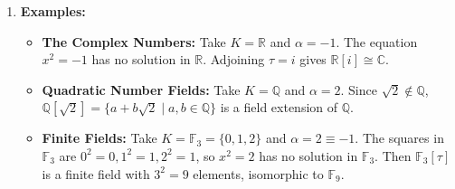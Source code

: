 \begin{exercisesolution}
\begin{enumerate}[label=\textbf{(\alph*)}]
\begin{itemize}
        \item \textbf{Axiom \textbf{(K7)} [Multiplicative Inverse]:} Let $z = a + b\tau \in K[\tau]$ with $z \ne 0$, meaning $(a, b) \ne (0, 0)$. Define the  of $z$ by:
        \[
        N(z) := (a + b\tau)(a - b\tau) = a^2 - \alpha b^2 \in K.
        \]
        We claim that $N(z) \ne 0$ in $K$. Indeed, if $N(z) = 0$, then $a^2 = \alpha b^2$.
        \begin{itemize}
            \item If $b \ne 0$, we can multiply by $(b^{-1})^2$ to obtain $(ab^{-1})^2 = \alpha$, which means $x = ab^{-1} \in K$ is a solution to $x^2 = \alpha$, contradicting the hypothesis that $x^2 = \alpha$ has no solution in $K$.
            \item If $b = 0$, then $a^2 = 0 \implies a = 0$, which contradicts $(a, b) \ne (0, 0)$.
        \end{itemize}
        Thus $N(z) = a^2 - \alpha b^2 \ne 0$ in $K$. Since $K$ is a field, $N(z)$ has a multiplicative inverse $N(z)^{-1} \in K$. Setting
        \[
        z^{-1} := \frac{a}{a^2 - \alpha b^2} - \frac{b}{a^2 - \alpha b^2}\tau \in K[\tau],
        \]
        we compute $z \cdot z^{-1} = \frac{(a+b\tau)(a-b\tau)}{a^2 - \alpha b^2} = \frac{a^2 - \alpha b^2}{a^2 - \alpha b^2} = 1$. Thus, every non-zero element has a multiplicative inverse.
    \end{itemize}
    This completes the proof that $K[\tau]$ is a field.

    \item \textbf{Examples:}
    \begin{itemize}
        \item \textbf{The Complex Numbers:} Take $K = \mathbb{R}$ and $\alpha = -1$. The equation $x^2 = -1$ has no solution in $\mathbb{R}$. Adjoining $\tau = i$ gives $\mathbb{R}[i] \cong \mathbb{C}$.
        \item \textbf{Quadratic Number Fields:} Take $K = \mathbb{Q}$ and $\alpha = 2$. Since $\sqrt{2} \notin \mathbb{Q}$, $\mathbb{Q}[\sqrt{2}] = \{a + b\sqrt{2} \mid a, b \in \mathbb{Q}\}$ is a field extension of $\mathbb{Q}$.
        \item \textbf{Finite Fields:} Take $K = \mathbb{F}_3 = \{0, 1, 2\}$ and $\alpha = 2 \equiv -1$. The squares in $\mathbb{F}_3$ are $0^2 = 0, 1^2 = 1, 2^2 = 1$, so $x^2 = 2$ has no solution in $\mathbb{F}_3$. Then $\mathbb{F}_3[\tau]$ is a finite field with $3^2 = 9$ elements, isomorphic to $\mathbb{F}_9$.
    \end{itemize}
\end{enumerate}
\end{exercisesolution}

